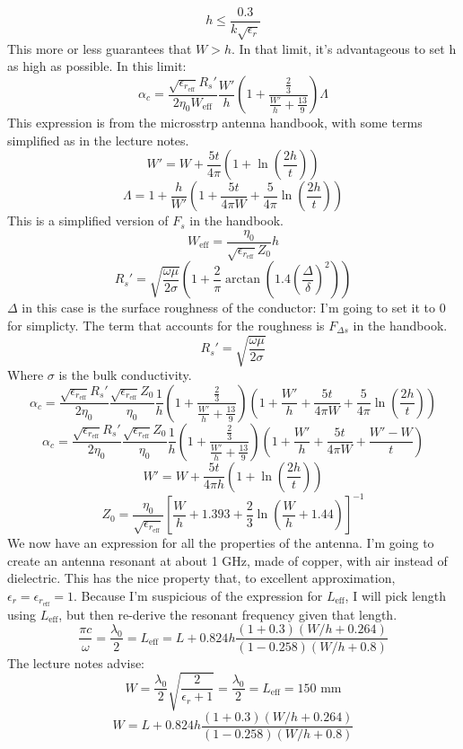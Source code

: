 \documentclass[final]{article}
\begin{document}
\[h\leq\frac{0.3}{k \sqrt{\epsilon_r}}\]
This more or less guarantees that \(W>h\). In that limit, it's advantageous to set h as high as possible.
In this limit:
\[\alpha_c=\frac{\sqrt{\epsilon_{r_{\text{eff}}}}R_s'}{2\eta_0 W_{\text{eff}}}\frac{W'}{h}\left(1+\frac{\frac{2}{3}}{\frac{W'}{h}+\frac{13}{9}}\right)\Lambda\]
This expression is from the microsstrp antenna handbook, with some terms simplified as in the lecture notes.
\[W'=W+\frac{5t}{4\pi}\left(1+\ln\left(\frac{2h}{t}\right)\right)\]
\[\Lambda=1+\frac{h}{W'}\left(1+\frac{5t}{4\pi W}+\frac{5}{4\pi}\ln\left(\frac{2h}{t}\right)\right)\]
This is a simplified version of  \(F_s\) in the handbook.
\[W_{\text{eff}}=\frac{\eta_0}{\sqrt{\epsilon_{r_{\text{eff}}}} Z_0} h\]
\[R_s'=\sqrt{\frac{\omega \mu}{2\sigma}}\left(1+\frac{2}{\pi} \arctan\left(1.4\left(\frac{\Delta}{\delta}\right)^2\right)\right)\]
\(\Delta\) in this case is the surface roughness of the conductor: I'm going to set it to 0 for simplicty. The term that accounts for the roughness is \(F_{\Delta s}\) in the handbook.
\[R_s'=\sqrt{\frac{\omega \mu}{2\sigma}}\]
Where \(\sigma\) is the bulk conductivity.
\[\alpha_c=\frac{\sqrt{\epsilon_{r_{\text{eff}}}}R_s'}{2\eta_0} \frac{\sqrt{\epsilon_{r_{\text{eff}}}} Z_0}{\eta_0} \frac{1}{h}\left(1+\frac{\frac{2}{3}}{\frac{W'}{h}+\frac{13}{9}}\right)
\left(1+\frac{W'}{h}+\frac{5t}{4\pi W}+\frac{5}{4\pi}\ln\left(\frac{2h}{t}\right)\right)\]
\[\alpha_c=\frac{\sqrt{\epsilon_{r_{\text{eff}}}}R_s'}{2\eta_0} \frac{\sqrt{\epsilon_{r_{\text{eff}}}} Z_0}{\eta_0} \frac{1}{h}\left(1+\frac{\frac{2}{3}}{\frac{W'}{h}+\frac{13}{9}}\right)
\left(1+\frac{W'}{h}+\frac{5t}{4\pi W}+\frac{W'-W}{t}\right)\]
\[W'=W+\frac{5t}{4\pi h} \left(1+\ln\left(\frac{2h}{t}\right)\right)\]
\[Z_0=\frac{\eta_0}{\sqrt{\epsilon_{r_{\text{eff}}}}}\left[\frac{W}{h}+1.393+\frac{2}{3}\ln\left(\frac{W}{h}+1.44\right)\right]^{-1}\]
We now have an expression for all the properties of the antenna. I'm going to create an antenna resonant at about 1 GHz, made of copper, with air instead of dielectric. This has the nice property that, to excellent approximation, \(\epsilon_r=\epsilon_{r_{\text{eff}}}=1\). Because I'm suspicious of the expression for \(L_{\text{eff}}\), I will pick length using \(L_{\text{eff}}\), but then re-derive the resonant frequency given that length.
\[\frac{\pi c}{\omega}=\frac{\lambda_0}{2}=L_{\text{eff}}=L+0.824h \frac{(1+0.3)(W/h+0.264)}{(1-0.258)(W/h+0.8)}\]
The lecture notes advise:
\[W=\frac{\lambda_0}{2}\sqrt{\frac{2}{\epsilon_r+1}}=\frac{\lambda_0}{2}=L_{\text{eff}}=150 \text{ mm}\]
\[W=L+0.824h \frac{(1+0.3)(W/h+0.264)}{(1-0.258)(W/h+0.8)}\]
\end{document}
